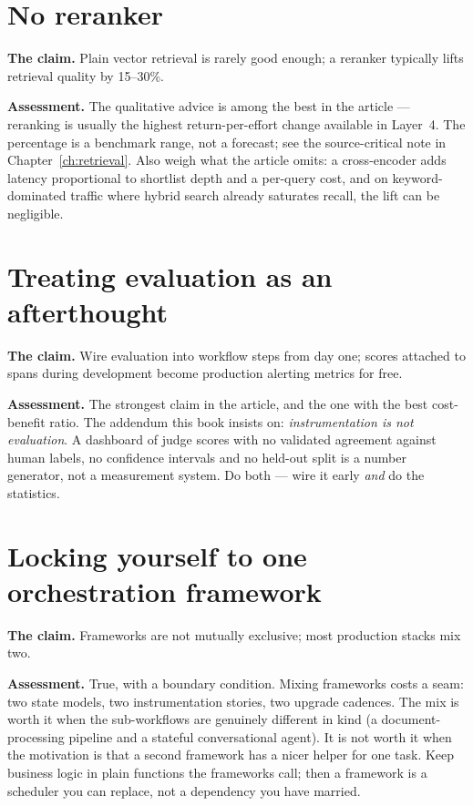\documentclass[11pt,twoside,openright]{book}
\theoremstyle{definition}
\theoremstyle{plain}
\theoremstyle{remark}
\begin{document}
\section{No reranker}

\textbf{The claim.} Plain vector retrieval is rarely good enough; a reranker
typically lifts retrieval quality by 15--30\%.

\textbf{Assessment.} The qualitative advice is among the best in the article ---
reranking is usually the highest return-per-effort change available in Layer~4.
The percentage is a benchmark range, not a forecast; see the source-critical
note in Chapter~\ref{ch:retrieval}. Also weigh what the article omits: a
cross-encoder adds latency proportional to shortlist depth and a per-query cost,
and on keyword-dominated traffic where hybrid search already saturates recall,
the lift can be negligible.

\section{Treating evaluation as an afterthought}

\textbf{The claim.} Wire evaluation into workflow steps from day one; scores
attached to spans during development become production alerting metrics for free.

\textbf{Assessment.} The strongest claim in the article, and the one with the
best cost-benefit ratio. The addendum this book insists on:
\emph{instrumentation is not evaluation}. A dashboard of judge scores with no
validated agreement against human labels, no confidence intervals and no
held-out split is a number generator, not a measurement system. Do both --- wire
it early \emph{and} do the statistics.

\section{Locking yourself to one orchestration framework}

\textbf{The claim.} Frameworks are not mutually exclusive; most production stacks
mix two.

\textbf{Assessment.} True, with a boundary condition. Mixing frameworks costs a
seam: two state models, two instrumentation stories, two upgrade cadences. The
mix is worth it when the sub-workflows are genuinely different in kind (a
document-processing pipeline and a stateful conversational agent). It is not
worth it when the motivation is that a second framework has a nicer helper for
one task. Keep business logic in plain functions the frameworks call; then a
framework is a scheduler you can replace, not a dependency you have married.
\end{document}
